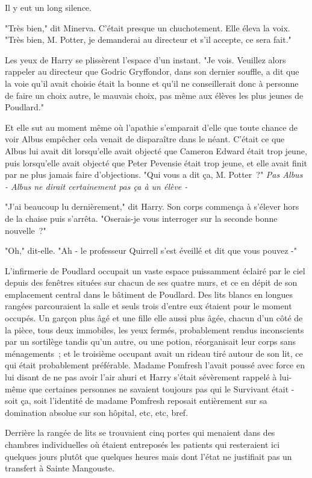 Il y eut un long silence.

"Très bien," dit Minerva. C'était presque un chuchotement. Elle éleva la voix. "Très bien, M. Potter, je demanderai au directeur et s'il accepte, ce sera fait."

Les yeux de Harry se plissèrent l'espace d'un instant. "Je vois. Veuillez alors rappeler au directeur que Godric Gryffondor, dans son dernier souffle, a dit que la voie qu'il avait choisie était la bonne et qu'il ne conseillerait donc à personne de faire un choix autre, le mauvais choix, pas même aux élèves les plus jeunes de Poudlard."

Et elle sut au moment même où l'apathie s'emparait d'elle que toute chance de voir Albus empêcher cela venait de disparaître dans le néant. C'était ce que Albus lui avait dit lorsqu'elle avait objecté que Cameron Edward était trop jeune, puis lorsqu'elle avait objecté que Peter Pevensie était trop jeune, et elle avait finit par ne plus jamais faire d'objections. "Qui vous a dit ça, M. Potter~?" \emph{Pas Albus - Albus ne dirait certainement pas ça à un élève -}

"J'ai beaucoup lu dernièrement," dit Harry. Son corps commença à s'élever hors de la chaise puis s'arrêta. "Oserais-je vous interroger sur la seconde bonne nouvelle~?"

"Oh," dit-elle. "Ah - le professeur Quirrell s'est éveillé et dit que vous pouvez -"

\later

L'infirmerie de Poudlard occupait un vaste espace puissamment éclairé par le ciel depuis des fenêtres situées sur chacun de ses quatre murs, et ce en dépit de son emplacement central dans le bâtiment de Poudlard. Des lits blancs en longues rangées parcouraient la salle et seuls trois d'entre eux étaient pour le moment occupés. Un garçon plus âgé et une fille elle aussi plus âgée, chacun d'un côté de la pièce, tous deux immobiles, les yeux fermés, probablement rendus inconscients par un sortilège tandis qu'un autre, ou une potion, réorganisait leur corps sans ménagements~; et le troisième occupant avait un rideau tiré autour de son lit, ce qui était probablement préférable. Madame Pomfresh l'avait poussé avec force en lui disant de ne pas avoir l'air ahuri et Harry s'était sévèrement rappelé à lui-même que certaines personnes ne savaient toujours pas qui le Survivant était - soit ça, soit l'identité de madame Pomfresh reposait entièrement sur sa domination absolue sur son hôpital, etc, etc, bref.

Derrière la rangée de lits se trouvaient cinq portes qui menaient dans des chambres individuelles où étaient entreposés les patients qui resteraient ici quelques jours plutôt que quelques heures mais dont l'état ne justifiait pas un transfert à Sainte Mangouste.

